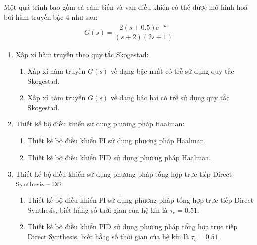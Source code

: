 \begin{exercise}
    Một quá trình bao gồm cả cảm biến và van điều khiển có thể được mô hình hoá bởi hàm truyền bậc 4 như sau:
        \begin{align*}
            G(s) = \dfrac{2(s + 0.5) e^{-5s}}{(s + 2)(2s + 1)}
        \end{align*}
    \begin{enumerate}
        \item Xấp xỉ hàm truyền theo quy tắc Skogestad:
            \begin{enumerate}
                \item Xấp xỉ hàm truyền $G(s)$ về dạng bậc nhất có trễ sử dụng quy tắc Skogestad.
                \item Xấp xỉ hàm truyền $G(s)$ về dạng bậc hai có trễ sử dụng quy tắc Skogestad.
            \end{enumerate}

        \item Thiết kế bộ điều khiển sử dụng phương pháp Haalman:
            \begin{enumerate}
                \item Thiết kế bộ điều khiển PI sử dụng phương pháp Haalman.
                \item Thiết kế bộ điều khiển PID sử dụng phương pháp Haalman.
            \end{enumerate}

        \item Thiết kế bộ điều khiển sử dụng phương pháp tổng hợp trực tiếp Direct Synthesis -- DS:
            \begin{enumerate}
                \item Thiết kế bộ điều khiển PI sử dụng phương pháp tổng hợp trực tiếp Direct Synthesis, biết hằng số thời gian của hệ kín là $\tau_c = 0.51$.

                \item Thiết kế bộ điều khiển PID sử dụng phương pháp tổng hợp trực tiếp Direct Synthesis, biết hằng số thời gian của hệ kín là $\tau_c = 0.51$.
            \end{enumerate}
    \end{enumerate}
\end{exercise}
